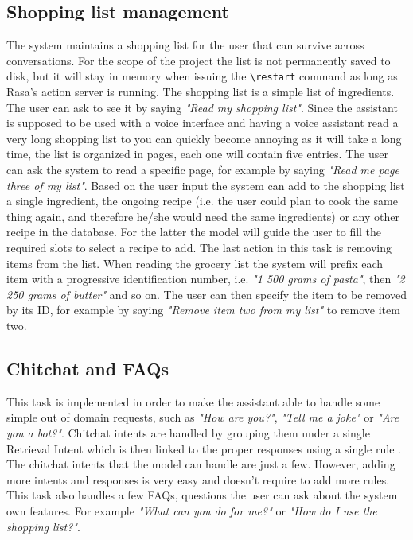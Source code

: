 \documentclass[journal, 11pt]{IEEEtran}
\begin{document}
\subsection{Shopping list management}
The system maintains a shopping list for the user that can survive across conversations. For the scope of the project the list is not permanently saved to disk, but it will stay in memory when issuing the \texttt{\textbackslash restart} command as long as Rasa's action server is running.
The shopping list is a simple list of ingredients. The user can ask to see it by saying \textit{"Read my shopping list"}. Since the assistant is supposed to be used with a voice interface and having a voice assistant read a very long shopping list to you can quickly become annoying as it will take a long time, the list is organized in pages, each one will contain five entries.
The user can ask the system to read a specific page, for example by saying \textit{"Read me page three of my list"}.
Based on the user input the system can add to the shopping list a single ingredient, the ongoing recipe (i.e. the user could plan to cook the same thing again, and therefore he/she would need the same ingredients) or any other recipe in the database.
For the latter the model will guide the user to fill the required slots to select a recipe to add.
The last action in this task is removing items from the list. When reading the grocery list the system will prefix each item with a progressive identification number, i.e. \textit{"1 500 grams of pasta"}, then \textit{"2 250 grams of butter"} and so on. The user can then specify the item to be removed by its ID, for example by saying \textit{"Remove item two from my list"} to remove item two.

\subsection{Chitchat and FAQs}
This task is implemented in order to make the assistant able to handle some simple out of domain requests, such as \textit{"How are you?"}, \textit{"Tell me a joke"} or \textit{"Are you a bot?"}.
Chitchat intents are handled by grouping them under a single Retrieval Intent \cite{rasachatfaqs} which is then linked to the proper responses using a single rule \cite{rasarules}.
The chitchat intents that the model can handle are just a few.
However, adding more intents and responses is very easy and doesn't require to add more rules.
This task also handles a few FAQs, questions the user can ask about the system own features. For example \textit{"What can you do for me?"} or \textit{"How do I use the shopping list?"}.
\end{document}
